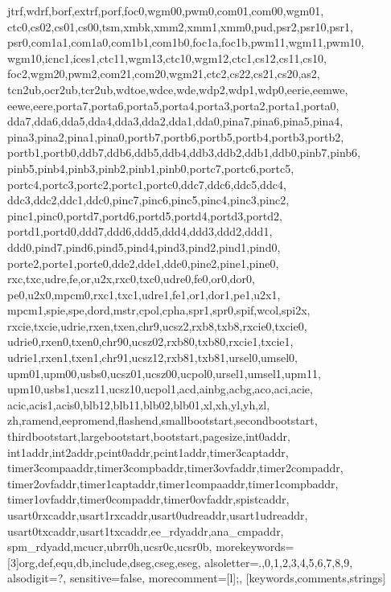 {{                jtrf,wdrf,borf,extrf,porf,foc0,wgm00,pwm0,com01,com00,wgm01,
                ctc0,cs02,cs01,cs00,tsm,xmbk,xmm2,xmm1,xmm0,pud,psr2,psr10,psr1,
                psr0,com1a1,com1a0,com1b1,com1b0,foc1a,foc1b,pwm11,wgm11,pwm10,
                wgm10,icnc1,ices1,ctc11,wgm13,ctc10,wgm12,ctc1,cs12,cs11,cs10,
                foc2,wgm20,pwm2,com21,com20,wgm21,ctc2,cs22,cs21,cs20,as2,
                tcn2ub,ocr2ub,tcr2ub,wdtoe,wdce,wde,wdp2,wdp1,wdp0,eerie,eemwe,
                eewe,eere,porta7,porta6,porta5,porta4,porta3,porta2,porta1,porta0,
                dda7,dda6,dda5,dda4,dda3,dda2,dda1,dda0,pina7,pina6,pina5,pina4,
                pina3,pina2,pina1,pina0,portb7,portb6,portb5,portb4,portb3,portb2,
                portb1,portb0,ddb7,ddb6,ddb5,ddb4,ddb3,ddb2,ddb1,ddb0,pinb7,pinb6,
                pinb5,pinb4,pinb3,pinb2,pinb1,pinb0,portc7,portc6,portc5,
                portc4,portc3,portc2,portc1,portc0,ddc7,ddc6,ddc5,ddc4,
                ddc3,ddc2,ddc1,ddc0,pinc7,pinc6,pinc5,pinc4,pinc3,pinc2,
                pinc1,pinc0,portd7,portd6,portd5,portd4,portd3,portd2,
                portd1,portd0,ddd7,ddd6,ddd5,ddd4,ddd3,ddd2,ddd1,
                ddd0,pind7,pind6,pind5,pind4,pind3,pind2,pind1,pind0,
                porte2,porte1,porte0,dde2,dde1,dde0,pine2,pine1,pine0,
                rxc,txc,udre,fe,or,u2x,rxc0,txc0,udre0,fe0,or0,dor0,
                pe0,u2x0,mpcm0,rxc1,txc1,udre1,fe1,or1,dor1,pe1,u2x1,
                mpcm1,spie,spe,dord,mstr,cpol,cpha,spr1,spr0,spif,wcol,spi2x,
                rxcie,txcie,udrie,rxen,txen,chr9,ucsz2,rxb8,txb8,rxcie0,txcie0,
                udrie0,rxen0,txen0,chr90,ucsz02,rxb80,txb80,rxcie1,txcie1,
                udrie1,rxen1,txen1,chr91,ucsz12,rxb81,txb81,ursel0,umsel0,
                upm01,upm00,usbs0,ucsz01,ucsz00,ucpol0,ursel1,umsel1,upm11,
                upm10,usbs1,ucsz11,ucsz10,ucpol1,acd,ainbg,acbg,aco,aci,acie,
                acic,acis1,acis0,blb12,blb11,blb02,blb01,xl,xh,yl,yh,zl,
                zh,ramend,eepromend,flashend,smallbootstart,secondbootstart,
                thirdbootstart,largebootstart,bootstart,pagesize,int0addr,
                int1addr,int2addr,pcint0addr,pcint1addr,timer3captaddr,
                timer3compaaddr,timer3compbaddr,timer3ovfaddr,timer2compaddr,
                timer2ovfaddr,timer1captaddr,timer1compaaddr,timer1compbaddr,
                timer1ovfaddr,timer0compaddr,timer0ovfaddr,spistcaddr,
                usart0rxcaddr,usart1rxcaddr,usart0udreaddr,usart1udreaddr,
                usart0txcaddr,usart1txcaddr,ee_rdyaddr,ana_cmpaddr,
                spm_rdyadd,mcucr,ubrr0h,ucsr0c,ucsr0b},%
morekeywords=[3]{org,def,equ,db,include,dseg,cseg,eseg},%
alsoletter={.,0,1,2,3,4,5,6,7,8,9},%
alsodigit={?},%
sensitive=false,%
morecomment=[l];,%
}[keywords,comments,strings]%

